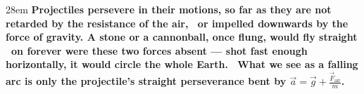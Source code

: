 \documentclass[border=4pt]{standalone}
\begin{document}
\begin{varwidth}{28em}
\large\bfseries
Projectiles persevere in their motions, so far as they are not retarded by the resistance of the air, \     or impelled downwards by the force of gravity. A stone or a cannonball, once flung, would fly straight \     on forever were these two forces absent — shot fast enough horizontally, it would circle the whole Earth. \     What we see as a falling arc is only the projectile's straight perseverance bent by $\vec{a} = \vec{g} + \tfrac{\vec{F}_{\text{air}}}{m}$.
\end{varwidth}
\end{document}
